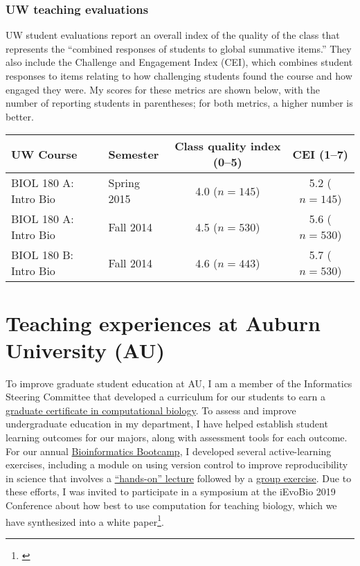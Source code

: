 \subsubsection*{UW teaching evaluations}
UW student evaluations report an overall index of the quality of the class that
represents the ``combined responses of students to global summative items.''
They also include the Challenge and Engagement Index (CEI), which combines
student responses to items relating to how challenging students found the
course and how engaged they were.
My scores for these metrics are shown below, with the number of reporting
students in parentheses;
for both metrics, a higher number is better.
\begin{center}
    \sffamily\small
\begin{tabular}{l l c c}
    \hline
    \textbf{UW Course} & \textbf{Semester} & \textbf{Class quality index} (0--5) & \textbf{CEI} (1--7) \\
    \hline
    BIOL 180 A: Intro Bio & Spring 2015 & 4.0 ($n = 145$) & 5.2 ($n = 145$) \\
    BIOL 180 A: Intro Bio & Fall 2014 & 4.5 ($n = 530$) & 5.6 ($n = 530$) \\
    BIOL 180 B: Intro Bio & Fall 2014 & 4.6 ($n = 443$) & 5.7 ($n = 530$) \\
    \hline
\end{tabular}
\end{center}

\section*{Teaching experiences at Auburn University (AU)}
To improve graduate student education at AU,
I am a member of the Informatics Steering Committee that developed a
curriculum for our students to earn a
\href{http://bulletin.auburn.edu/thegraduateschool/graduatedegreesoffered/biologicalsciencesmsphd_major/computationalbiology_gradcert/}{graduate certificate in computational biology}.
To assess and improve undergraduate education in my department, I have helped
establish student learning outcomes for our majors, along with assessment tools
for each outcome.
For our annual
\href{http://www.auburn.edu/cosam/bioinformatics/}{Bioinformatics Bootcamp},
I developed several active-learning exercises,
including a module on using version control to improve reproducibility in
science that involves a
\href{http://phyletica.org/slides/git-intro/}{``hands-on'' lecture}
followed by a
\href{https://github.com/joaks1/au-bootcamp-git-intro}{group exercise}.
Due to these efforts, I was invited to participate in a symposium at the
iEvoBio 2019 Conference about how best to use computation for teaching biology,
which we have synthesized into a
white paper\footnote{\label{ievobiopaper}}.

